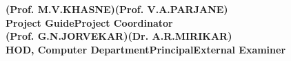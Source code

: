 \begin{spacing}{0}
\vspace{3.0cm}
\large{\textbf{(Prof. M.V.KHASNE)}}\hspace*{1.6in}\large{\textbf {(Prof. V.A.PARJANE)}}\\
\hspace*{0.7in}\textbf{Project Guide}\hspace*{2.1in}\textbf{Project Coordinator}\\[3cm]
\hspace*{0.5cm}\large{\textbf{(Prof. G.N.JORVEKAR)}}\hspace*{0.8in}\large{\textbf{(Dr. A.R.MIRIKAR)}}\\
\textbf{HOD, Computer Department}\hspace*{0.8in}\textbf{Principal}\hspace*{1.1in}\textbf{External Examiner}
\end{spacing}